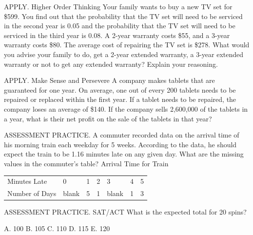 \documentclass{article}
\newenvironment{practice}[2]{}{}        %
\newcommand{\answer}[1]{}               %
\newcommand{\placeholder}[2]{}          %
\newcommand{\te}[1]{}                   %
\begin{document}
\begin{practice}{23}{3}
APPLY. Higher Order Thinking Your family wants to buy a new TV set for \$599. You find out that the probability that the TV set will need to be serviced in the second year is 0.05 and the probability that the TV set will need to be serviced in the third year is 0.08. A 2-year warranty costs \$55, and a 3-year warranty costs \$80. The average cost of repairing the TV set is \$278. What would you advise your family to do, get a 2-year extended warranty, a 3-year extended warranty or not to get any extended warranty? Explain your reasoning.
\answer{No warranty, because the expected cost for 3 years is less with no extended warranty than with a 2-year or 3-year warranty. Expected costs for 3 years: No extended warranty: (\$599+\$278(0.05)+\$278(0.08)=\$635.14). 2-year extended warranty: (\$599+\$55+\$278(0.08)=\$676.24). 3-year extended warranty: (\$599+\$80=\$679.00).}
\end{practice}
\begin{practice}{24}{2}
APPLY. Make Sense and Persevere A company makes tablets that are guaranteed for one year. On average, one out of every 200 tablets needs to be repaired or replaced within the first year. If a tablet needs to be repaired, the company loses an average of \$140. If the company sells 2,600,000 of the tablets in a year, what is their net profit on the sale of the tablets in that year?
\te{Callout: If no repairs or replacement is needed for a tablet, the company makes a \$24 profit on that tablet.}
\placeholder{illustration}{Tablet angled in perspective with blue screen and colored app icons against teal background; speech bubble to right gives the \$24 profit condition transcribed above.}
\answer{\$60,268,000}
\end{practice}
\begin{practice}{25}{2}
ASSESSMENT PRACTICE. A commuter recorded data on the arrival time of his morning train each weekday for 5 weeks. According to the data, he should expect the train to be 1.16 minutes late on any given day. What are the missing values in the commuter's table?
Arrival Time for Train
\begin{tabular}{lllllll}
Minutes Late & 0 & 1 & 2 & 3 & 4 & 5 \\
Number of Days & blank & 5 & 1 & blank & 1 & 3 \\
\end{tabular}
\answer{14; 1}
\end{practice}
\begin{practice}{26}{1}
ASSESSMENT PRACTICE. SAT/ACT What is the expected total for 20 spins?
\placeholder{diagram}{Circular spinner divided into ten equal sectors numbered clockwise starting upper right: 1 blue,2 orange,3 green,4 purple,5 ocher,6 cyan,7 dark green,8 orange,9 purple,10 ocher. Black central arrow points up-right toward 2.}
A. 100
B. 105
C. 110
D. 115
E. 120
\answer{C}
\end{practice}
\end{document}
